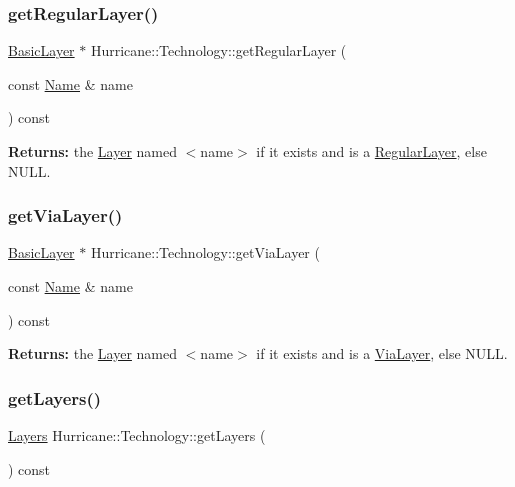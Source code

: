 \subsubsection{\texorpdfstring{get\+Regular\+Layer()}{getRegularLayer()}}
{\footnotesize\ttfamily \mbox{\hyperlink{classHurricane_1_1BasicLayer}{Basic\+Layer}} $\ast$ Hurricane\+::\+Technology\+::get\+Regular\+Layer (\begin{DoxyParamCaption}\item[{const \mbox{\hyperlink{classHurricane_1_1Name}{Name}} \&}]{name }\end{DoxyParamCaption}) const}

{\bfseries Returns\+:} the \mbox{\hyperlink{classHurricane_1_1Layer}{Layer}} named {\ttfamily $<$name$>$} if it exists and is a \mbox{\hyperlink{classHurricane_1_1RegularLayer}{Regular\+Layer}}, else {\ttfamily N\+U\+LL}. \mbox{\label{classHurricane_1_1Technology_a9edd085c08487642dd8745b66cf40c76}} 
\subsubsection{\texorpdfstring{get\+Via\+Layer()}{getViaLayer()}}
{\footnotesize\ttfamily \mbox{\hyperlink{classHurricane_1_1BasicLayer}{Basic\+Layer}} $\ast$ Hurricane\+::\+Technology\+::get\+Via\+Layer (\begin{DoxyParamCaption}\item[{const \mbox{\hyperlink{classHurricane_1_1Name}{Name}} \&}]{name }\end{DoxyParamCaption}) const}

{\bfseries Returns\+:} the \mbox{\hyperlink{classHurricane_1_1Layer}{Layer}} named {\ttfamily $<$name$>$} if it exists and is a \mbox{\hyperlink{classHurricane_1_1ViaLayer}{Via\+Layer}}, else {\ttfamily N\+U\+LL}. \mbox{\label{classHurricane_1_1Technology_a4e58c5ae8e3e82d7fe1b3bb939d6a633}} 
\subsubsection{\texorpdfstring{get\+Layers()}{getLayers()}}
{\footnotesize\ttfamily \mbox{\hyperlink{namespaceHurricane_a7b7200a36ab7ce8a157ddbe78b625f38}{Layers}} Hurricane\+::\+Technology\+::get\+Layers (\begin{DoxyParamCaption}{ }\end{DoxyParamCaption}) const\hspace{0.3cm}{\ttfamily [inline]}}

